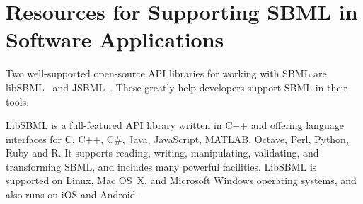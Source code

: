 





\section{Resources for Supporting SBML in Software Applications}

Two well-supported open-source API libraries for working with SBML are  libSBML~\cite{bornstein2008libsbml} and JSBML~\cite{drager2011jsbml}. 
These greatly help developers support SBML in their tools.  

LibSBML is a full-featured API library written in C++ and offering language interfaces for C, C++, C\#, Java, JavaScript, MATLAB, Octave, Perl, Python, Ruby and R.  It supports reading, writing, manipulating, validating, and transforming SBML, and includes many powerful facilities.  LibSBML is supported on Linux, Mac OS~X, and Microsoft Windows operating systems, and also runs on iOS and Android.


